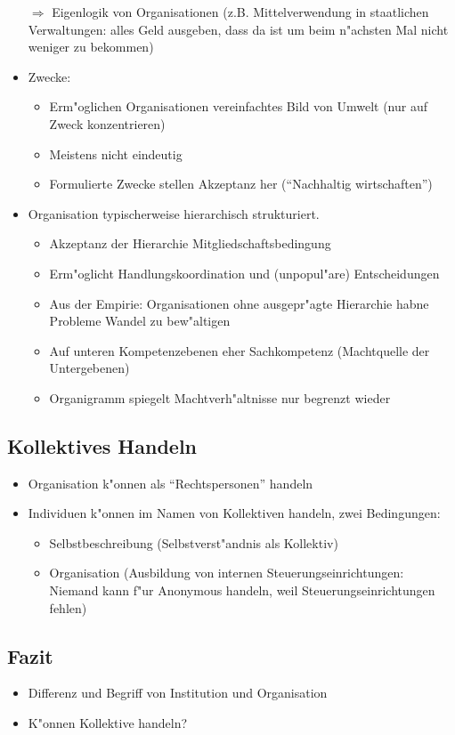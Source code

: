 \begin{itemize}
		$\Rightarrow$ Eigenlogik von Organisationen (z.B. Mittelverwendung in staatlichen Verwaltungen: alles Geld ausgeben, dass da ist um beim n"achsten Mal nicht weniger zu bekommen)
	\item
		Zwecke:
		\begin{itemize}
			\item
				Erm"oglichen Organisationen vereinfachtes Bild von Umwelt (nur auf Zweck konzentrieren)
			\item
				Meistens nicht eindeutig
			\item
				Formulierte Zwecke stellen Akzeptanz her (\enquote{Nachhaltig wirtschaften})
		\end{itemize}
	\item
		Organisation typischerweise hierarchisch strukturiert. 
		\begin{itemize}
			\item
				Akzeptanz der Hierarchie Mitgliedschaftsbedingung
			\item
				Erm"oglicht Handlungskoordination und (unpopul"are) Entscheidungen
			\item
				Aus der Empirie: Organisationen ohne ausgepr"agte Hierarchie habne Probleme Wandel zu bew"altigen
			\item
				Auf unteren Kompetenzebenen eher Sachkompetenz (Machtquelle der Untergebenen)
			\item
				Organigramm spiegelt Machtverh"altnisse nur begrenzt wieder
		\end{itemize}

\end{itemize}

\subsection{Kollektives Handeln}
\begin{itemize}
	\item
		Organisation k"onnen als \enquote{Rechtspersonen} handeln
	\item
		Individuen k"onnen im Namen von Kollektiven handeln, zwei Bedingungen:
		\begin{itemize}
			\item
				Selbstbeschreibung (Selbstverst"andnis als Kollektiv)
			\item
				Organisation (Ausbildung von internen Steuerungseinrichtungen: Niemand kann f"ur Anonymous handeln, weil Steuerungseinrichtungen fehlen)
		\end{itemize}
\end{itemize}

\subsection{Fazit}
\begin{itemize}
	\item
		Differenz und Begriff von Institution und Organisation
	\item
		K"onnen Kollektive handeln?
\end{itemize}

